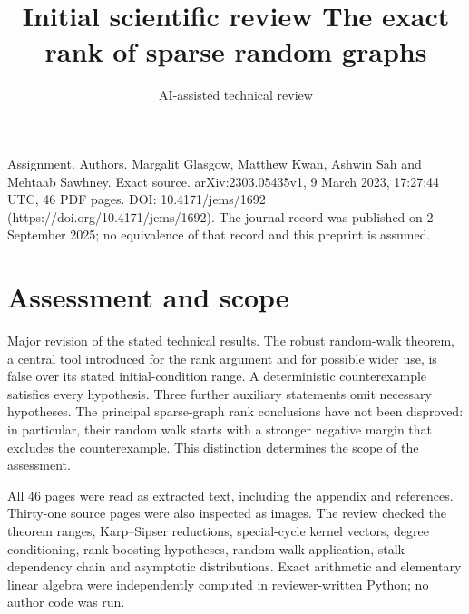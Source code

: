\documentclass[10pt]{article}
\title{Initial scientific review
The exact rank of sparse random graphs}
\author{AI-assisted technical review}
\date{}
\begin{document}
\maketitle
Assignment. Authors. Margalit Glasgow, Matthew Kwan, Ashwin Sah and Mehtaab Sawhney. Exact source. arXiv:2303.05435v1, 9 March 2023, 17:27:44 UTC, 46 PDF pages. DOI: 10.4171/jems/1692 (https://doi.org/10.4171/jems/1692). The journal record was published on 2 September 2025; no equivalence of that record and this preprint is assumed.\par
\section*{Assessment and scope}
Major revision of the stated technical results. The robust random-walk theorem, a central tool introduced for the rank argument and for possible wider use, is false over its stated initial-condition range. A deterministic counterexample satisfies every hypothesis. Three further auxiliary statements omit necessary hypotheses. The principal sparse-graph rank conclusions have not been disproved: in particular, their random walk starts with a stronger negative margin that excludes the counterexample. This distinction determines the scope of the assessment.\par
All 46 pages were read as extracted text, including the appendix and references. Thirty-one source pages were also inspected as images. The review checked the theorem ranges, Karp–Sipser reductions, special-cycle kernel vectors, degree conditioning, rank-boosting hypotheses, random-walk application, stalk dependency chain and asymptotic distributions. Exact arithmetic and elementary linear algebra were independently computed in reviewer-written Python; no author code was run.\par
\end{document}
